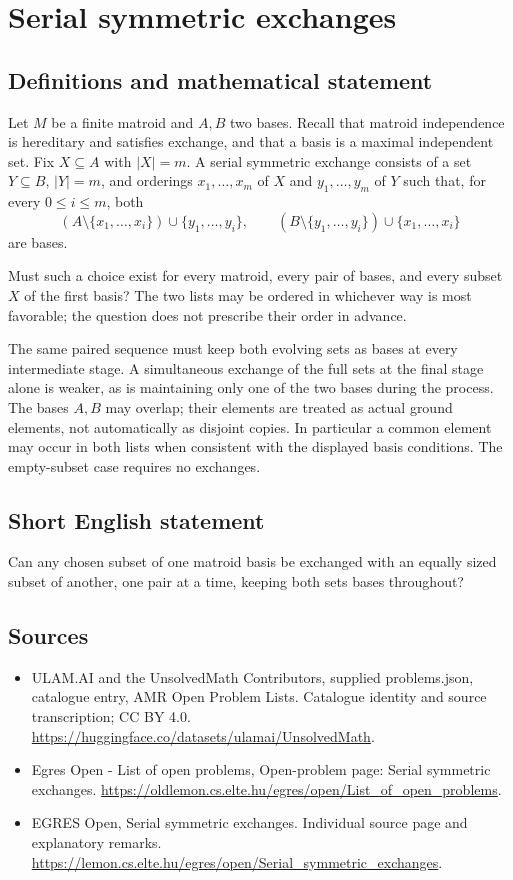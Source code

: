\documentclass[11pt,a4paper]{article}
\begin{document}
\section*{Serial symmetric exchanges}\label{statement}

\subsection{Definitions and mathematical statement}
Let $M$ be a finite matroid and $A,B$ two bases. Recall that
matroid independence is hereditary and satisfies exchange, and
that a basis is a maximal independent set. Fix $X\subseteq A$
with $|X|=m$. A serial symmetric exchange consists of a set
$Y\subseteq B$, $|Y|=m$, and orderings $x_1,\ldots,x_m$ of $X$
and $y_1,\ldots,y_m$ of $Y$ such that, for every $0\le i\le m$,
both
\[
 (A\setminus\{x_1,\ldots,x_i\})\cup\{y_1,\ldots,y_i\},
 \qquad
 (B\setminus\{y_1,\ldots,y_i\})\cup\{x_1,\ldots,x_i\}
\]
are bases.

Must such a choice exist for every matroid, every pair of bases,
and every subset $X$ of the first basis?
The two lists may be ordered in whichever way is most favorable;
the question does not prescribe their order in advance.

The same paired sequence must keep both evolving sets as bases
at every intermediate stage. A simultaneous exchange of the full
sets at the final stage alone is weaker, as is maintaining only
one of the two bases during the process. The bases $A,B$ may
overlap; their elements are treated as actual ground elements,
not automatically as disjoint copies. In particular a common
element may occur in both lists when consistent with the displayed
basis conditions. The empty-subset case requires no exchanges.
\subsection{Short English statement}
Can any chosen subset of one matroid basis be exchanged with
an equally sized subset of another, one pair at a time, keeping both sets bases throughout?
\subsection{Sources}
\begin{itemize}
\item[S1] ULAM.AI and the UnsolvedMath Contributors, supplied problems.json, catalogue entry, AMR Open Problem Lists. Catalogue identity and source transcription; CC BY 4.0.
\url{https://huggingface.co/datasets/ulamai/UnsolvedMath}.
\item[S2] Egres Open - List of open problems, Open-problem page: Serial symmetric exchanges. 
\url{https://oldlemon.cs.elte.hu/egres/open/List_of_open_problems}.
\item[S3] EGRES Open, Serial symmetric exchanges. Individual source page and explanatory remarks.
\url{https://lemon.cs.elte.hu/egres/open/Serial_symmetric_exchanges}.
\end{itemize}
\end{document}
